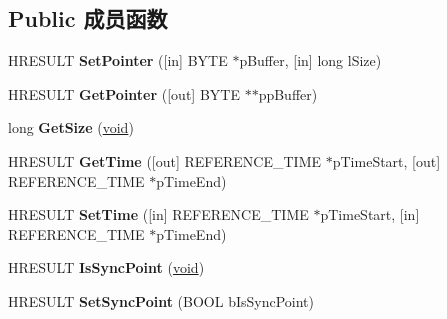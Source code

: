 \subsection*{Public 成员函数}
\begin{DoxyCompactItemize}
\item 
\mbox{\label{interface_i_a_m_media_type_sample_a2c788fc180a683afbbace32b0258a429}} 
H\+R\+E\+S\+U\+LT {\bfseries Set\+Pointer} (\mbox{[}in\mbox{]} B\+Y\+TE $\ast$p\+Buffer, \mbox{[}in\mbox{]} long l\+Size)
\item 
\mbox{\label{interface_i_a_m_media_type_sample_acbf7d8076b15b8c997a34df7ff41c26a}} 
H\+R\+E\+S\+U\+LT {\bfseries Get\+Pointer} (\mbox{[}out\mbox{]} B\+Y\+TE $\ast$$\ast$pp\+Buffer)
\item 
\mbox{\label{interface_i_a_m_media_type_sample_a06f530cfeeb04044c34f4154c022aa50}} 
long {\bfseries Get\+Size} (\hyperlink{interfacevoid}{void})
\item 
\mbox{\label{interface_i_a_m_media_type_sample_a06e6ffe024e2c40bce22405af4bed7b0}} 
H\+R\+E\+S\+U\+LT {\bfseries Get\+Time} (\mbox{[}out\mbox{]} R\+E\+F\+E\+R\+E\+N\+C\+E\+\_\+\+T\+I\+ME $\ast$p\+Time\+Start, \mbox{[}out\mbox{]} R\+E\+F\+E\+R\+E\+N\+C\+E\+\_\+\+T\+I\+ME $\ast$p\+Time\+End)
\item 
\mbox{\label{interface_i_a_m_media_type_sample_a0203551ca2bcc0411d34d56bed5b450d}} 
H\+R\+E\+S\+U\+LT {\bfseries Set\+Time} (\mbox{[}in\mbox{]} R\+E\+F\+E\+R\+E\+N\+C\+E\+\_\+\+T\+I\+ME $\ast$p\+Time\+Start, \mbox{[}in\mbox{]} R\+E\+F\+E\+R\+E\+N\+C\+E\+\_\+\+T\+I\+ME $\ast$p\+Time\+End)
\item 
\mbox{\label{interface_i_a_m_media_type_sample_a0726434bd1a0724d8a039a0ae2aecd43}} 
H\+R\+E\+S\+U\+LT {\bfseries Is\+Sync\+Point} (\hyperlink{interfacevoid}{void})
\item 
\mbox{\label{interface_i_a_m_media_type_sample_af244da1149c84c5d28143e13096a29ee}} 
H\+R\+E\+S\+U\+LT {\bfseries Set\+Sync\+Point} (B\+O\+OL b\+Is\+Sync\+Point)
\item 
$$
\end{DoxyCompactItemize}
